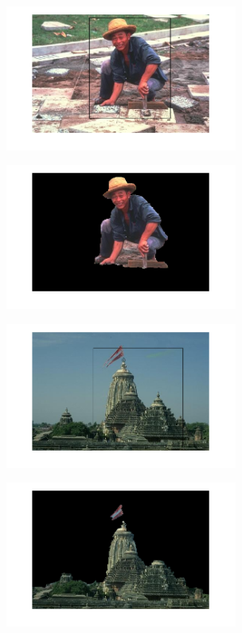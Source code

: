 \documentclass[a4paper]{article}
\begin{document}
\begin{figure}[h]
\begin{subfigure}{.5\textwidth}
  \centering
  \includegraphics[width = 3in]{man_in.png}
  \label{fig:sfig1}
\end{subfigure}%
\begin{subfigure}{.5\textwidth}
  \centering
  \includegraphics[width = 3in]{man_out.png}
  \label{fig:sfig2}
\end{subfigure}


\begin{subfigure}{.5\textwidth}
  \centering
  \includegraphics[width = 3in]{temple_in}
  \label{fig:sfig2}
\end{subfigure}
\begin{subfigure}{.5\textwidth}
  \centering
  \includegraphics[width = 3in]{temple_out}
  \label{fig:sfig2}
\end{subfigure}


\end{figure}
\end{document}
